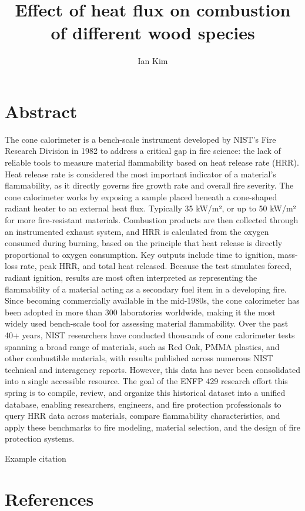 \documentclass{abstract}
\title{Effect of heat flux on combustion of different wood species}
\author{Ian Kim},
\begin{document}
\maketitle
\section{Abstract}
The cone calorimeter is a bench-scale instrument developed by NIST's Fire Research Division in 1982 to address a critical gap in fire science: the lack of reliable tools to measure material flammability based on heat release rate (HRR). Heat release rate is considered the most important indicator of a material's flammability, as it directly governs fire growth rate and overall fire severity. The cone calorimeter works by exposing a sample placed beneath a cone-shaped radiant heater to an external heat flux. Typically 35 kW/m², or up to 50 kW/m² for more fire-resistant materials. Combustion products are then collected through an instrumented exhaust system, and HRR is calculated from the oxygen consumed during burning, based on the principle that heat release is directly proportional to oxygen consumption. Key outputs include time to ignition, mass-loss rate, peak HRR, and total heat released. Because the test simulates forced, radiant ignition, results are most often interpreted as representing the flammability of a material acting as a secondary fuel item in a developing fire. Since becoming commercially available in the mid-1980s, the cone calorimeter has been adopted in more than 300 laboratories worldwide, making it the most widely used bench-scale tool for assessing material flammability.
Over the past 40+ years, NIST researchers have conducted thousands of cone calorimeter tests spanning a broad range of materials, such as Red Oak, PMMA plastics, and other combustible materials, with results published across numerous NIST technical and interagency reports. However, this data has never been consolidated into a single accessible resource. The goal of the ENFP 429 research effort this spring is to compile, review, and organize this historical dataset into a unified database, enabling researchers, engineers, and fire protection professionals to query HRR data across materials, compare flammability characteristics, and apply these benchmarks to fire modeling, material selection, and the design of fire protection systems.


Example citation \cite{babrauskas1982development, brown1988cone,emil1989flammability}


\section{References}
\printbibliography[heading=none]
\end{document}
